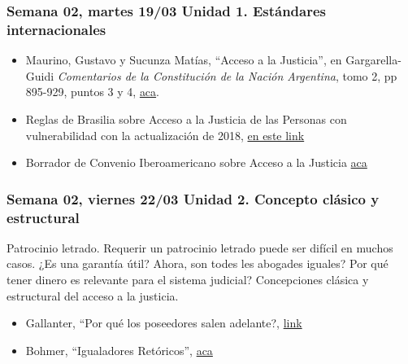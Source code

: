 \documentclass[
]{article}
\begin{document}
\hypertarget{semana-02-martes-1903-unidad-1.-estuxe1ndares-internacionales}{%
\subsubsection{Semana 02, martes 19/03 Unidad 1. Estándares
internacionales}\label{semana-02-martes-1903-unidad-1.-estuxe1ndares-internacionales}}

\begin{itemize}
\item
  Maurino, Gustavo y Sucunza Matías, ``Acceso a la Justicia'', en
  Gargarella- Guidi \emph{Comentarios de la Constitución de la Nación
  Argentina}, tomo 2, pp 895-929, puntos 3 y 4,
  \href{https://drive.google.com/file/d/1Gj7BF0AtPkcnPp7YI7-M2oU-olQHS_I9/view?usp=sharing}{aca}.
\item
  Reglas de Brasilia sobre Acceso a la Justicia de las Personas con
  vulnerabilidad con la actualización de 2018,
  \href{http://www.cumbrejudicial.org/comision-de-seguimiento-de-las-reglas-de-brasilia/documentos-comision-de-seguimiento-de-las-reglas-de-brasilia/item/817-cien-reglas-de-brasilia-actualizadas-version-abril-2018-xix-cumbre-judicial-asamblea-plenaria-san-francisco-de-quito}{en
  este link}
\item
  Borrador de Convenio Iberoamericano sobre Acceso a la Justicia
  \href{https://drive.google.com/file/d/1ZvhBoVmS245Mt4_mxBN_GJOdlh1jDEL5/view?usp=sharing}{aca}
\end{itemize}

\hypertarget{semana-02-viernes-2203-unidad-2.-concepto-cluxe1sico-y-estructural}{%
\subsubsection{Semana 02, viernes 22/03 Unidad 2. Concepto clásico y
estructural}\label{semana-02-viernes-2203-unidad-2.-concepto-cluxe1sico-y-estructural}}

Patrocinio letrado. Requerir un patrocinio letrado puede ser difícil en
muchos casos. ¿Es una garantía útil? Ahora, son todes les abogades
iguales? Por qué tener dinero es relevante para el sistema judicial?
Concepciones clásica y estructural del acceso a la justicia.

\begin{itemize}
\item
  Gallanter, ``Por qué los poseedores salen adelante?,
  \href{https://drive.google.com/file/d/1Fj3STLmXxHrJglgGgs5JUtDjXy0DSJ3o/view?usp=sharing}{link}
\item
  Bohmer, ``Igualadores Retóricos'',
  \href{https://drive.google.com/file/d/0B50ljTnhr79kMWQ2OTgzYzMtNGNiNS00YjQxLThjYjYtYzg2YWYyNzc0MTlh/view?usp=sharing\&resourcekey=0-QzTl1yGSNgnHMOI_ICHjEg}{aca}
\end{itemize}
\end{document}
